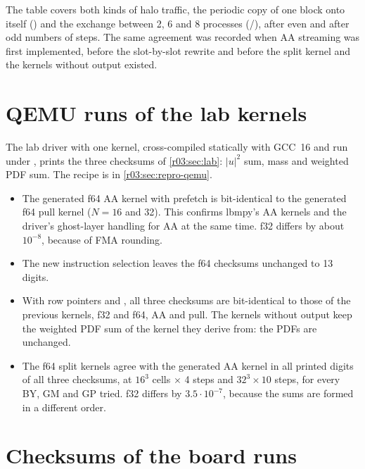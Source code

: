 The table covers both kinds of halo traffic, the periodic copy of one block onto itself
() and the exchange between 2, 6 and 8 processes (/),
after even and after odd numbers of steps. The same agreement was recorded when AA streaming was
first implemented, before the slot-by-slot rewrite and before the split kernel and the kernels
without output existed.

\section{QEMU runs of the lab kernels}\label{r03:sec:ver-qemu}

The lab driver with one kernel, cross-compiled statically with GCC~16 and run under
, prints the three checksums of
\cref{r03:sec:lab}: $|u|^2$ sum, mass and weighted PDF sum. The recipe is in
\cref{r03:sec:repro-qemu}.
\begin{itemize}
  \item The generated f64 AA kernel with prefetch is bit-identical to the generated f64 pull
        kernel ($N = 16$ and 32). This confirms lbmpy's AA kernels and the driver's ghost-layer
        handling for AA at the same time. f32 differs by about $10^{-8}$, because of FMA
        rounding.
  \item The new instruction selection leaves the f64 checksums unchanged to 13 digits.
  \item With row pointers and , all three checksums are bit-identical to those
        of the previous kernels, f32 and f64, AA and pull. The kernels without output keep the
        weighted PDF sum of the kernel they derive from: the PDFs are unchanged.
  \item The f64 split kernels agree with the generated AA kernel in all printed digits of all
        three checksums, at $16^3$ cells $\times$ 4 steps and $32^3 \times 10$ steps, for every
        BY, GM and GP tried. f32 differs by $3.5\cdot10^{-7}$, because the sums are formed in a
        different order.
\end{itemize}

\section{Checksums of the board runs}\label{r03:sec:ver-board}

